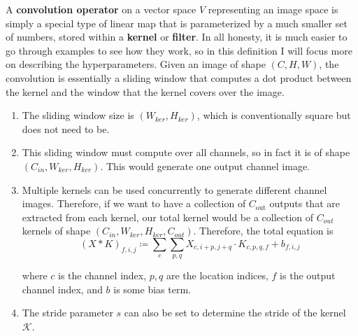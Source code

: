   \begin{definition}
    A \textbf{convolution operator} on a vector space $V$ representing an image space is simply a special type of linear map that is parameterized by a much smaller set of numbers, stored within a \textbf{kernel} or \textbf{filter}. In all honesty, it is much easier to go through examples to see how they work, so in this definition I will focus more on describing the hyperparameters. Given an image of shape $(C, H, W)$, the convolution is essentially a sliding window that computes a dot product between the kernel and the window that the kernel covers over the image. 
    \begin{enumerate}
      \item The sliding window size is $(W_{ker}, H_{ker})$, which is conventionally square but does not need to be. 

      \item This sliding window must compute over all channels, so in fact it is of shape $(C_{in}, W_{ker}, H_{ker})$. This would generate one output channel image. 

      \item Multiple kernels can be used concurrently to generate different channel images. Therefore, if we want to have a collection of $C_{\text{out}}$ outputs that are extracted from each kernel, our total kernel would be a collection of $C_{out}$ kernels of shape $(C_{in}, W_{ker}, H_{ker}, C_{out})$. Therefore, the total equation is 
      \begin{equation}
        (X \ast K)_{f, i, j} \coloneqq \sum_c \sum_{p, q} X_{c, i + p, j + q} \cdot K_{c, p, q, f} + b_{f, i, j}
      \end{equation}

      where $c$ is the channel index, $p, q$ are the location indices, $f$ is the output channel index, and $b$ is some bias term. 

      \item The stride parameter $s$ can also be set to determine the stride of the kernel $\mathcal{K}$. 


\end{enumerate}
\end{definition}
